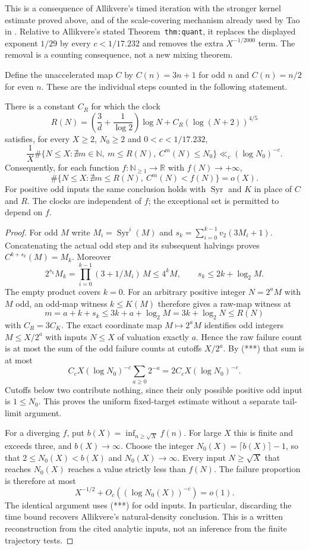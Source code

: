 This is a consequence of Allikvere's timed iteration with the stronger
kernel estimate proved above, and of the scale-covering mechanism already
used by Tao in \cite[\S3]{Tao2026v7}. Relative to Allikvere's stated
Theorem~\texttt{thm:quant}, it replaces the displayed exponent $1/29$
by every $c<1/17.232$ and removes the extra $X^{-1/2000}$ term.
The removal is a counting consequence, not a new mixing theorem.

Define the unaccelerated map $C$ by $C(n)=3n+1$ for odd $n$
and $C(n)=n/2$ for even $n$. These are the individual steps counted
in the following statement.

\begin{corollary}
\label{cor:Allikvere-universal-clock}
There is a constant $C_R$ for which the clock
\[
 R(N)=\left(\frac3d+\frac1{\log2}\right)\log N
                         +C_R(\log(N+2))^{4/5}
\]
satisfies, for every $X\ge2$, $N_0\ge2$ and $0<c<1/17.232$,
\[
 \frac1X\#\{N\le X:\nexists m\in\mathbb N,\ m\le R(N),\
                       C^m(N)\le N_0\}
              \ll_c(\log N_0)^{-c}.
\]
Consequently, for each function $f:\mathbb N_{\ge1}\to\mathbb R$
with $f(N)\to+\infty$,
\[
 \#\{N\le X:\nexists m\le R(N),\ C^m(N)<f(N)\}=o(X).
\]
For positive odd inputs the same conclusion holds with $\operatorname{Syr}$ and
$K$ in place of $C$ and $R$. The clocks are independent of $f$;
the exceptional set is permitted to depend on $f$.
\end{corollary}
\begin{proof}
For odd $M$ write $M_i=\operatorname{Syr}^i(M)$ and
$s_k=\sum_{i=0}^{k-1}v_2(3M_i+1)$. Concatenating the actual
odd step and its subsequent halvings proves
$C^{k+s_k}(M)=M_k$. Moreover
\[
 2^{s_k}M_k=\prod_{i=0}^{k-1}(3+1/M_i)\,M
              \le4^kM,
 \qquad s_k\le2k+\log_2 M.
\]
The empty product covers $k=0$. For an arbitrary positive integer
$N=2^aM$ with $M$ odd, an odd-map witness $k\le K(M)$ therefore gives
a raw-map witness at
\[
 m=a+k+s_k\le3k+a+\log_2 M=3k+\log_2 N
       \le R(N)
\]
with $C_R=3C_K$. The exact coordinate map
$M\mapsto2^aM$ identifies odd integers $M\le X/2^a$ with inputs
$N\le X$ of valuation exactly $a$. Hence the raw failure count is
at most the sum of the odd failure counts at cutoffs $X/2^a$.
By (***) that sum is at most
\[
 C_cX(\log N_0)^{-c}\sum_{a\ge0}2^{-a}
          =2C_cX(\log N_0)^{-c}.
\]
Cutoffs below two contribute nothing, since their only possible
positive odd input is $1\le N_0$. This proves the uniform fixed-target
estimate without a separate tail-limit argument.

For a diverging $f$, put
$b(X)=\inf_{n\ge\sqrt X}f(n)$. For large $X$ this is finite and
exceeds three, and $b(X)\to\infty$. Choose the integer
$N_0(X)=\lceil b(X)\rceil-1$, so that
$2\le N_0(X)<b(X)$ and $N_0(X)\to\infty$.
Every input $N\ge\sqrt X$ that reaches $N_0(X)$ reaches a value
strictly less than $f(N)$. The failure proportion is therefore at
most
\[
 X^{-1/2}+O_c((\log N_0(X))^{-c})=o(1).
\]
The identical argument uses (***) for odd inputs. In particular,
discarding the time bound recovers Allikvere's natural-density
conclusion. This is a written reconstruction from the cited analytic
inputs, not an inference from the finite trajectory tests.
\end{proof}

